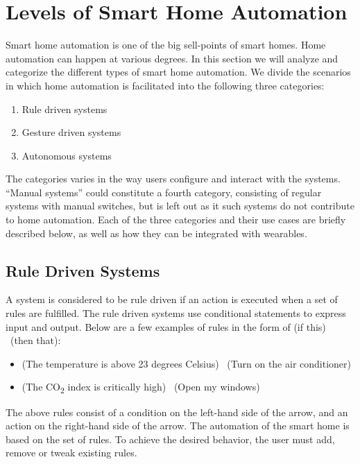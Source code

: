\section{Levels of Smart Home Automation}\label{sec:system-categories}
Smart home automation is one of the big sell-points of smart homes.
Home automation can happen at various degrees. 
In this section we will analyze and categorize the different types of smart home automation. 
We divide the scenarios in which home automation is facilitated into the following three categories:

\begin{enumerate}
    \item Rule driven systems
    \item Gesture driven systems
    \item Autonomous systems
\end{enumerate}

The categories varies in the way users configure and interact with the systems. 
``Manual systems'' could constitute a fourth category, consisting of regular systems with manual switches,
but is left out as it such systems do not contribute to home automation.
Each of the three categories and their use cases are briefly described below,
as well as how they can be integrated with wearables.

\subsection{Rule Driven Systems}

A system is considered to be rule driven if an action is executed when a set of rules are fulfilled. 
The rule driven systems use conditional statements to express input and output. 
Below are a few examples of rules in the form of (if this) \textrightarrow~(then that):

\begin{itemize}
    \item (The temperature is above 23 degrees Celsius) \textrightarrow~(Turn on the air conditioner)
    \item (The CO\textsubscript{2} index is critically high) \textrightarrow~(Open my windows)
\end{itemize}

The above rules consist of a condition on the left-hand side of the arrow, 
and an action on the right-hand side of the arrow.
The automation of the smart home is based on the set of rules. 
To achieve the desired behavior, the user must add, remove or tweak existing rules.

